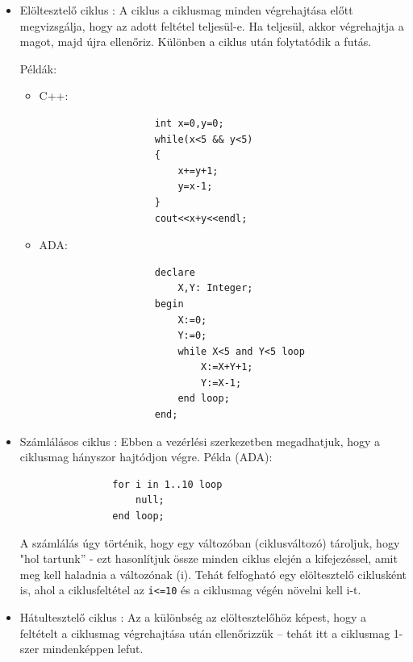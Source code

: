 \documentclass[margin=0px]{article}
\begin{document}
\begin{itemize}
\begin{itemize}
              \item	Elöltesztelő ciklus : A ciklus a ciklusmag minden végrehajtása előtt megvizsgálja, hogy az adott
                    feltétel teljesül-e. Ha teljesül, akkor végrehajtja a magot, majd újra ellenőriz. Különben a ciklus
                    után folytatódik a futás.

                    Példák:
                    \begin{itemize}
                        \item	C++:
                              \begin{verbatim}
                    int x=0,y=0;
                    while(x<5 && y<5)
                    {
                        x+=y+1;
                        y=x-1;
                    }
                    cout<<x+y<<endl;
                \end{verbatim}

                        \item	ADA:
                              \begin{verbatim}
                    declare
                        X,Y: Integer;
                    begin
                        X:=0;
                        Y:=0;
                        while X<5 and Y<5 loop
                            X:=X+Y+1;
                            Y:=X-1;
                        end loop;
                    end;
                \end{verbatim}
                    \end{itemize}

              \item	Számlálásos ciklus : Ebben a vezérlési szerkezetben megadhatjuk, hogy a ciklusmag hányszor
                    hajtódjon végre.
                    Példa (ADA):
                    \begin{verbatim}
                for i in 1..10 loop 
                    null;
                end loop;
            \end{verbatim}
                    A számlálás úgy történik, hogy egy változóban (ciklusváltozó) tároljuk, hogy "hol tartunk” - ezt hasonlítjuk
                    össze minden ciklus elején a kifejezéssel, amit meg kell haladnia a változónak (i). Tehát
                    felfogható egy elöltesztelő ciklusként is, ahol a ciklusfeltétel az \texttt{i<=10} és a ciklusmag végén
                    növelni kell i-t.

              \item	Hátultesztelő ciklus : Az a különbség az elöltesztelőhöz képest, hogy a feltételt a ciklusmag
                    végrehajtása után ellenőrizzük – tehát itt a ciklusmag 1-szer mindenképpen lefut.


\end{itemize}
\end{itemize}
\end{document}
